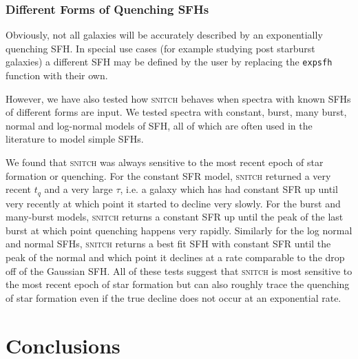 \documentclass[useAMS,usenatbib]{mn2e}
\begin{document}
\subsubsection{Different Forms of Quenching SFHs}

Obviously, not all galaxies will be accurately described by an exponentially quenching SFH. In special use cases (for example studying post starburst galaxies) a different SFH may be defined by the user by replacing the \texttt{expsfh} function with their own. 

However, we have also tested how \textsc{snitch} behaves when spectra with known SFHs of different forms are input. We tested spectra with  constant, burst, many burst, normal and log-normal models of SFH, all of which are often used in the literature to model simple SFHs. 

We found that \textsc{snitch} was always sensitive to the most recent epoch of star formation or quenching. For the constant SFR model, \textsc{snitch} returned a very recent $t_q$ and a very large $\tau$, i.e. a galaxy which has had constant SFR up until very recently at which point it started to decline very slowly. For the burst and many-burst models, \textsc{snitch} returns a constant SFR up until the peak of the last burst at which point quenching happens very rapidly. Similarly for the log normal and normal SFHs, \textsc{snitch} returns a best fit SFH with constant SFR until the peak of the normal and which point it declines at a rate comparable to the drop off of the Gaussian SFH. All of these tests suggest that \textsc{snitch} is most sensitive to the most recent epoch of star formation but can also roughly trace the quenching of star formation even if the true decline does not occur at an exponential rate. 



\section{Conclusions}
\end{document}
